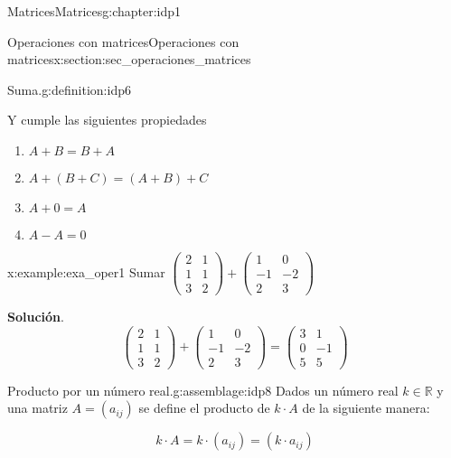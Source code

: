 \documentclass[oneside,12pt,]{book}
\newcommand{\blocktitlefont}{\relax}
\newcommand{\amp}{&}
\begin{document}
\begin{chapterptx}{Matrices}{}{Matrices}{}{}{g:chapter:idp1}
\begin{sectionptx}{Operaciones con matrices}{}{Operaciones con matrices}{}{}{x:section:sec_operaciones_matrices}
\begin{definition}{Suma.}{g:definition:idp6}
\begin{equation*}
\end{equation*}
%
\par
Y cumple las siguientes propiedades%
\par
%
\begin{enumerate}
\item{}\(\displaystyle A+B=B+A\)%
\item{}\(\displaystyle A+(B+C)=(A+B)+C\)%
\item{}\(\displaystyle A+0=A\)%
\item{}\(\displaystyle A-A=0\)%
\end{enumerate}
%
\end{definition}
\begin{example}{}{x:example:exa_oper1}%
Sumar \(\begin{pmatrix}
2 \amp 1 \\
1 \amp 1 \\
3 \amp 2
\end{pmatrix} 
+
\begin{pmatrix}
1 \amp 0 \\
-1 \amp -2 \\
2 \amp 3
\end{pmatrix}    \)%
\par\smallskip%
\noindent\textbf{\blocktitlefont Solución}.\hypertarget{g:solution:idp7}{}\quad{}%
\begin{equation*}
\begin{pmatrix}
2 \amp 1 \\
1 \amp 1 \\
3 \amp 2
\end{pmatrix} 
+
\begin{pmatrix}
1 \amp 0 \\
-1 \amp -2 \\
2 \amp 3
\end{pmatrix}    = 
\begin{pmatrix}
3 \amp 1 \\
0 \amp-1 \\
5 \amp 5
\end{pmatrix}    
\end{equation*}
%
\end{example}
\begin{assemblage}{Producto por un número real.}{g:assemblage:idp8}%
Dados un número real \(k\in \mathbb{R}\) y una matriz \(A=(a_{ij})\) se define el producto de \(k\cdot A\) de la siguiente manera:%
\par
%
\begin{equation*}
k\cdot A=k\cdot (a_{ij})= (k\cdot a_{ij})
\end{equation*}

\end{assemblage}
\end{sectionptx}
\end{chapterptx}
\end{document}
